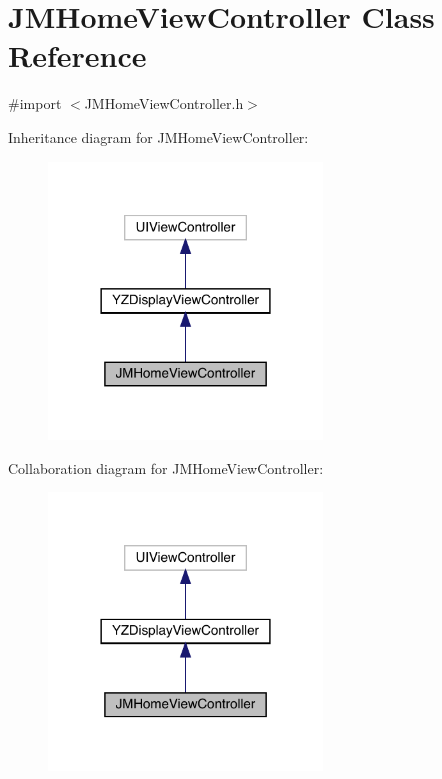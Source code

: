 \hypertarget{interface_j_m_home_view_controller}{}\section{J\+M\+Home\+View\+Controller Class Reference}
\label{interface_j_m_home_view_controller}


{\ttfamily \#import $<$J\+M\+Home\+View\+Controller.\+h$>$}



Inheritance diagram for J\+M\+Home\+View\+Controller\+:\nopagebreak
\begin{figure}[H]
\begin{center}
\leavevmode
\includegraphics[width=206pt]{interface_j_m_home_view_controller__inherit__graph}
\end{center}
\end{figure}


Collaboration diagram for J\+M\+Home\+View\+Controller\+:\nopagebreak
\begin{figure}[H]
\begin{center}
\leavevmode
\includegraphics[width=206pt]{interface_j_m_home_view_controller__coll__graph}
\end{center}
\end{figure}
